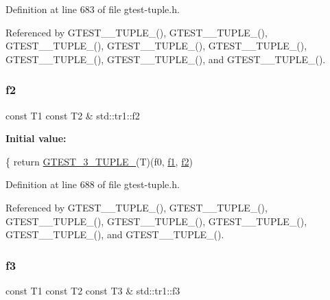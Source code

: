 Definition at line 683 of file gtest-\/tuple.\+h.



Referenced by G\+T\+E\+S\+T\+\_\+\_\+\+T\+U\+P\+L\+E\+\_\+(), G\+T\+E\+S\+T\+\_\+\_\+\+T\+U\+P\+L\+E\+\_\+(), G\+T\+E\+S\+T\+\_\+\_\+\+T\+U\+P\+L\+E\+\_\+(), G\+T\+E\+S\+T\+\_\+\_\+\+T\+U\+P\+L\+E\+\_\+(), G\+T\+E\+S\+T\+\_\+\_\+\+T\+U\+P\+L\+E\+\_\+(), G\+T\+E\+S\+T\+\_\+\_\+\+T\+U\+P\+L\+E\+\_\+(), G\+T\+E\+S\+T\+\_\+\_\+\+T\+U\+P\+L\+E\+\_\+(), and G\+T\+E\+S\+T\+\_\+\_\+\+T\+U\+P\+L\+E\+\_\+().

\mbox{\label{namespacestd_1_1tr1_a87dd9e009868361317f587126dba63d4}} 
\subsubsection{\texorpdfstring{f2}{f2}}
{\footnotesize\ttfamily const T1 const T2 \& std\+::tr1\+::f2}

{\bfseries Initial value\+:}
\begin{DoxyCode}
\{
  \textcolor{keywordflow}{return} \hyperlink{gtest-tuple_8h_af2c3eab3f1a5197b408fce44eb3ed9da}{GTEST\_3\_TUPLE\_}(T)(f0, \hyperlink{namespacestd_1_1tr1_a9c0fa65b105f8e2f58ba59ecf75fd000}{f1}, \hyperlink{namespacestd_1_1tr1_a87dd9e009868361317f587126dba63d4}{f2})
\end{DoxyCode}


Definition at line 688 of file gtest-\/tuple.\+h.



Referenced by G\+T\+E\+S\+T\+\_\+\_\+\+T\+U\+P\+L\+E\+\_\+(), G\+T\+E\+S\+T\+\_\+\_\+\+T\+U\+P\+L\+E\+\_\+(), G\+T\+E\+S\+T\+\_\+\_\+\+T\+U\+P\+L\+E\+\_\+(), G\+T\+E\+S\+T\+\_\+\_\+\+T\+U\+P\+L\+E\+\_\+(), G\+T\+E\+S\+T\+\_\+\_\+\+T\+U\+P\+L\+E\+\_\+(), G\+T\+E\+S\+T\+\_\+\_\+\+T\+U\+P\+L\+E\+\_\+(), and G\+T\+E\+S\+T\+\_\+\_\+\+T\+U\+P\+L\+E\+\_\+().

\mbox{\label{namespacestd_1_1tr1_a0f7c3b47d27d42d82d1a333ea420ce4e}} 
\subsubsection{\texorpdfstring{f3}{f3}}
{\footnotesize\ttfamily const T1 const T2 const T3 \& std\+::tr1\+::f3}

